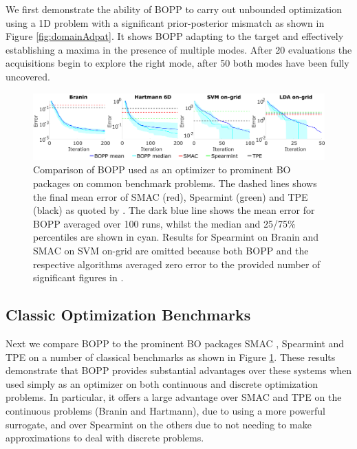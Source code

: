 We first demonstrate the ability of BOPP to carry out unbounded optimization using a 1D problem with a significant prior-posterior mismatch as shown in Figure \ref{fig:domainAdpat}.  It shows BOPP adapting to the target and effectively establishing a maxima in the presence of multiple modes.   After 20 evaluations the acquisitions begin to explore the right mode, after 50 both modes have been fully uncovered.

\begin{figure}[t]
	\centering
	\includegraphics[width=1\textwidth]{combined_opt_plots}
	\caption{Comparison of BOPP  used as an optimizer to prominent BO packages on common benchmark problems.  
		The dashed lines shows the final mean error of SMAC (red), Spearmint (green) and TPE (black) as quoted by \cite{eggensperger2013towards}. %
		The dark blue line shows the mean error for BOPP averaged over 100 runs, whilst the median and 25/75\% percentiles are shown in cyan. Results for Spearmint on Branin and SMAC on SVM on-grid are omitted because both BOPP and the respective algorithms averaged zero error to the provided number of significant figures in \cite{eggensperger2013towards}.
		\label{fig:bayes-opt}}
\end{figure}

\subsection{Classic Optimization Benchmarks}

Next we compare BOPP to the prominent BO packages SMAC \cite{hutter2011sequential}, Spearmint \cite{snoek2012practical} and TPE \cite{bergstra2011algorithms} on a number of classical benchmarks as shown in Figure \ref{fig:bayes-opt}.  These results demonstrate that BOPP provides substantial advantages over these systems when used simply as an optimizer on both continuous and discrete optimization problems.  In particular, it offers a large advantage over SMAC and TPE on the continuous problems (Branin and Hartmann), due to using a more powerful surrogate, and over Spearmint on the others due to not needing to make approximations to deal with discrete problems.

